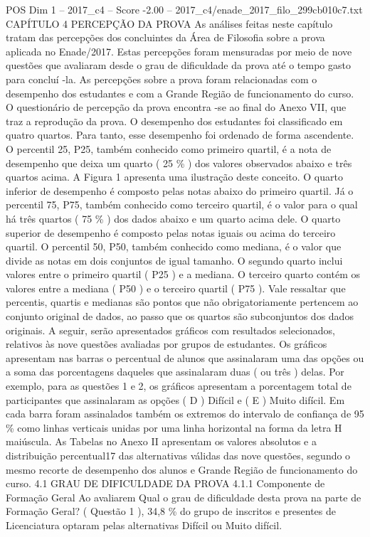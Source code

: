 \begin{textsample}{POS Dim 1 – 2017\_c4 – Score -2.00 – 2017\_c4/enade\_2017\_filo\_299cb010c7.txt}  \label{ex:f1_pos_272}
CAPÍTULO 4 PERCEPÇÃO DA PROVA As análises feitas neste capítulo tratam das percepções dos concluintes da Área de Filosofia sobre a prova aplicada no Enade/2017.
Estas percepções foram mensuradas por meio de nove questões que avaliaram desde o grau de dificuldade da prova até o tempo gasto para concluí -la.
As percepções sobre a prova foram relacionadas com o desempenho dos estudantes e com a Grande Região de funcionamento do curso.
O questionário de percepção da prova encontra -se ao final do Anexo VII, que traz a reprodução da prova.
O desempenho dos estudantes foi classificado em quatro quartos.
Para tanto, esse desempenho foi ordenado de forma ascendente.
O percentil 25, P25, também conhecido como primeiro quartil, é a nota de desempenho que deixa um quarto ( 25 \% ) dos valores observados abaixo e três quartos acima.
A Figura 1 apresenta uma ilustração deste conceito.
O quarto inferior de desempenho é composto pelas notas abaixo do primeiro quartil.
Já o percentil 75, P75, também conhecido como terceiro quartil, é o valor para o qual há três quartos ( 75 \% ) dos dados abaixo e um quarto acima dele.
O quarto superior de desempenho é composto pelas notas iguais ou acima do terceiro quartil.
O percentil 50, P50, também conhecido como mediana, é o valor que divide as notas em dois conjuntos de igual tamanho.
O segundo quarto inclui valores entre o primeiro quartil ( P25 ) e a mediana.
O terceiro quarto contém os valores entre a mediana ( P50 ) e o terceiro quartil ( P75 ).
Vale ressaltar que percentis, quartis e medianas são pontos que não obrigatoriamente pertencem ao conjunto original de dados, ao passo que os quartos são subconjuntos dos dados originais.
A seguir, serão apresentados gráficos com resultados selecionados, relativos às nove questões avaliadas por grupos de estudantes.
Os gráficos apresentam nas barras o percentual de alunos que assinalaram uma das opções ou a soma das porcentagens daqueles que assinalaram duas ( ou três ) delas.
Por exemplo, para as questões 1 e 2, os gráficos apresentam a porcentagem total de participantes que assinalaram as opções ( D ) Difícil e ( E ) Muito difícil.
Em cada barra foram assinalados também os extremos do intervalo de confiança de 95 \% como linhas verticais unidas por uma linha horizontal na forma da letra H maiúscula.
As Tabelas no Anexo II apresentam os valores absolutos e a distribuição percentual17 das alternativas válidas das nove questões, segundo o mesmo recorte de desempenho dos alunos e Grande Região de funcionamento do curso. 4.1 GRAU DE DIFICULDADE DA PROVA 4.1.1 Componente de Formação Geral Ao avaliarem Qual o grau de dificuldade desta prova na parte de Formação Geral? ( Questão 1 ), 34,8 \% do grupo de inscritos e presentes de Licenciatura optaram pelas alternativas Difícil ou Muito difícil.

\end{textsample}
